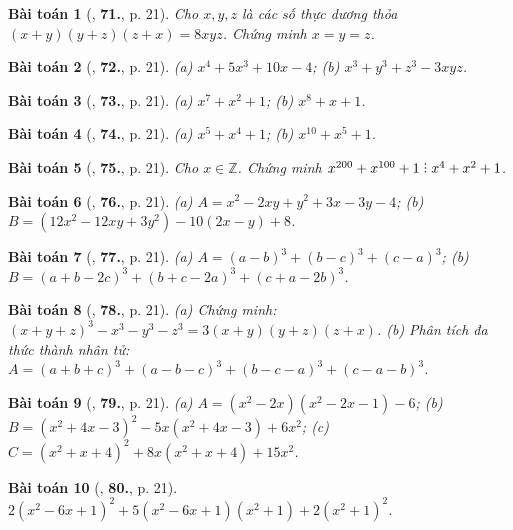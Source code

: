 \documentclass{article}
\numberwithin{equation}{section}
\newtheorem{baitoan}{Bài toán}
\DeclareRobustCommand{\divby}{%
	\mathrel{\vbox{\baselineskip.65ex\lineskiplimit0pt\hbox{.}\hbox{.}\hbox{.}}}%
}
\begin{document}
\begin{baitoan}[\cite{Tuyen_Toan_8}, \textbf{71.}, p. 21]
	Cho $x,y,z$ là các số thực dương thỏa $(x + y)(y + z)(z + x) = 8xyz$. Chứng minh $x = y = z$.
\end{baitoan}

\begin{baitoan}[\cite{Tuyen_Toan_8}, \textbf{72.}, p. 21]
	(a) $x^4 + 5x^3 + 10x - 4$; (b) $x^3 + y^3 + z^3 - 3xyz$.
\end{baitoan}

\begin{baitoan}[\cite{Tuyen_Toan_8}, \textbf{73.}, p. 21]
	(a) $x^7 + x^2 + 1$; (b) $x^8 + x + 1$.
\end{baitoan}

\begin{baitoan}[\cite{Tuyen_Toan_8}, \textbf{74.}, p. 21]
	(a) $x^5 + x^4 + 1$; (b) $x^{10} + x^5 + 1$.
\end{baitoan}

\begin{baitoan}[\cite{Tuyen_Toan_8}, \textbf{75.}, p. 21]
	Cho $x\in\mathbb{Z}$. Chứng minh $x^{200} + x^{100} + 1\divby x^4 + x^2 + 1$.
\end{baitoan}

\begin{baitoan}[\cite{Tuyen_Toan_8}, \textbf{76.}, p. 21]
	(a) $A = x^2 - 2xy + y^2 + 3x - 3y - 4$; (b) $B = (12x^2 - 12xy + 3y^2) - 10(2x - y) + 8$.
\end{baitoan}

\begin{baitoan}[\cite{Tuyen_Toan_8}, \textbf{77.}, p. 21]
	(a) $A = (a - b)^3 + (b - c)^3 + (c - a)^3$; (b) $B = (a + b - 2c)^3 + (b + c - 2a)^3 + (c + a - 2b)^3$.
\end{baitoan}

\begin{baitoan}[\cite{Tuyen_Toan_8}, \textbf{78.}, p. 21]
	(a) Chứng minh: $(x + y + z)^3 - x^3 - y^3 - z^3 = 3(x + y)(y + z)(z + x)$. (b) Phân tích đa thức thành nhân tử: $A = (a + b + c)^3 + (a - b - c)^3 + (b - c - a)^3 + (c - a - b)^3$.
\end{baitoan}

\begin{baitoan}[\cite{Tuyen_Toan_8}, \textbf{79.}, p. 21]
	(a) $A = (x^2 - 2x)(x^2 - 2x - 1) - 6$; (b) $B = (x^2 + 4x - 3)^2 - 5x(x^2 + 4x - 3) + 6x^2$; (c) $C = (x^2 + x + 4)^2 + 8x(x^2 + x + 4) + 15x^2$.
\end{baitoan}

\begin{baitoan}[\cite{Tuyen_Toan_8}, \textbf{80.}, p. 21]
	$2(x^2 - 6x + 1)^2 + 5(x^2 -6x + 1)(x^2 + 1) + 2(x^2 + 1)^2$.
\end{baitoan}
\end{document}
